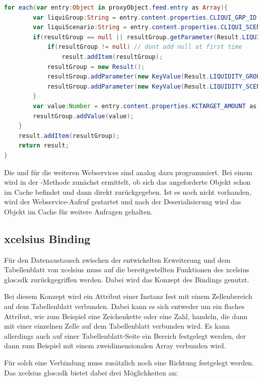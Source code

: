 \begin{onehalfspacing}
\begin{programm}[ht]
\begin{lstlisting}[language=ActionScript]
	for each(var entry:Object in proxyObject.feed.entry as Array){
		var liquiGroup:String = entry.content.properties.CLIQUI_GRP_ID as String;
		var liquiScenario:String = entry.content.properties.CLIQUI_SCENARIO as String;
		if(resultGroup == null || resultGroup.getParameter(Result.LIQUIDITY_GROUP) != liquiGroup || resultGroup.getParameter(Result.LIQUIDITY_SCENARIO) != liquiScenario){
			if(resultGroup != null) // dont add null at first time
				result.addItem(resultGroup);
			resultGroup = new Result();
			resultGroup.addParameter(new KeyValue(Result.LIQUIDITY_GROUP,liquiGroup));
			resultGroup.addParameter(new KeyValue(Result.LIQUIDITY_SCENARIO,liquiScenario));
		}
		var value:Number = entry.content.properties.KCTARGET_AMOUNT as Number;
		resultGroup.addValue(value);
	}
	result.addItem(resultGroup);
	return result;
}
\end{lstlisting}
\caption{Deserialisierung des XML-Formats in die interne Objektstruktur\label{listing:deserialisierung}}
\end{programm}


Die  und  für die weiteren Webservices sind analog dazu programmiert. Bei einem  wird in der -Methode zunächst ermittelt, ob sich das angeforderte Objekt schon im Cache befindet und dann direkt zurückgegeben. Ist es noch nicht vorhanden, wird der Webservice-Aufruf gestartet und nach der Deserialisierung wird das Objekt im Cache für weitere Anfragen gehalten.

\subsection{\gls{xcelsius} Binding}
\label{sec:xcelsius_binding}
Für den Datenaustausch zwischen der entwickelten Erweiterung und dem Tabellenblatt von \gls{xcelsius} muss auf die bereitgestellten Funktionen des \gls{xcelsius} \gls{glos:sdk} zurückgegriffen werden. Dabei wird das Konzept des Bindings genutzt.

Bei diesem Konzept wird ein Attribut einer Instanz fest mit einem Zellenbereich auf dem Tabellenblatt verbunden. Dabei kann es sich entweder um ein flaches Attribut, wie zum Beispiel eine Zeichenkette oder eine Zahl, handeln, die dann mit einer einzelnen Zelle auf dem Tabellenblatt verbunden wird. Es kann allerdings auch auf einer Tabellenblatt-Seite ein Bereich festgelegt werden, der dann zum Beispiel mit einem zweidimensionalen Array verbunden wird.

Für solch eine Verbindung muss zusätzlich noch eine Richtung festgelegt werden. Das \gls{xcelsius} \gls{glos:sdk} bietet dabei drei Möglichkeiten an:


\end{onehalfspacing}
